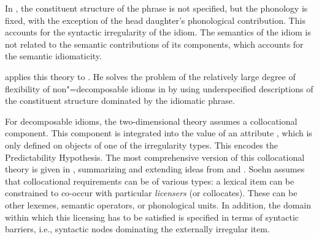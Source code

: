 \documentclass[output=paper
	        ,collection
	        ,collectionchapter
 	        ,biblatex
                ,babelshorthands
                ,newtxmath
                ,draftmode
                ,colorlinks, citecolor=brown
]{langscibook}
\begin{document}

In , the constituent structure of the phrase is not specified, but the phonology is fixed, with the exception of the head daughter's phonological contribution. This accounts for the syntactic irregularity of the idiom. The semantics of the idiom is not related to the semantic contributions of its components, which accounts for the semantic idiomaticity.

\citet{Soehn2006a} applies this theory to . He solves the problem of the relatively large degree of flexibility of non"=decomposable idioms in 
by using underspecified descriptions of the constituent structure dominated by the idiomatic phrase.

For decomposable idioms, the two-dimensional theory assumes a collocational component. This component is integrated into the value of an attribute , which is only defined on  objects of one of the irregularity types. 
This encodes the Predictability Hypothesis.
%
The most comprehensive version of this collocational theory is given in \citet{Soehn:09}, summarizing and extending ideas from \citet{Soehn2006a} and \citet{richter-soehn:2006}. 
Soehn assumes that collocational requirements can be of various types: 
a lexical item can be constrained to co-occur with particular \emph{licensers} (or collocates). These can be other lexemes, semantic operators, or phonological units. In addition, the domain within which this licensing has to be satisfied is specified in terms of syntactic barriers, i.e., syntactic nodes dominating the externally irregular item.
\end{document}
